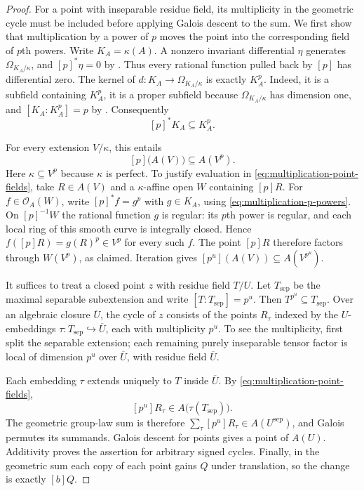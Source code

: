 \begin{proof}
For a point with inseparable residue field, its multiplicity in the
geometric cycle must be included before applying Galois descent to
the sum. We first show that multiplication by a power of $p$ moves
the point into the corresponding field of $p$th powers.
Write $K_A=\kappa(A)$.  A nonzero invariant differential $\eta$
generates $\Omega_{K_A/\kappa}$, and $[p]^*\eta=0$ by
.  Thus every rational function pulled back
by $[p]$ has differential zero.  The kernel of
$d:K_A\longrightarrow\Omega_{K_A/\kappa}$ is exactly $K_A^p$.
Indeed, it is a subfield containing $K_A^p$, it is a proper subfield
because $\Omega_{K_A/\kappa}$ has dimension one, and
$[K_A:K_A^p]=p$ by .  Consequently
\begin{equation}\label{eq:multiplication-p-powers}
                         [p]^*K_A\subseteq K_A^p.
\end{equation}

For every extension $V/\kappa$, this entails
\begin{equation}\label{eq:multiplication-point-fields}
                         [p]\bigl(A(V)\bigr)\subseteq A(V^p).
\end{equation}
Here $\kappa\subseteq V^p$ because $\kappa$ is perfect.  To justify
evaluation in \eqref{eq:multiplication-point-fields}, take
$R\in A(V)$ and a $\kappa$-affine open $W$ containing $[p]R$.
For $f\in\mathcal O_A(W)$, write $[p]^*f=g^p$ with
$g\in K_A$, using \eqref{eq:multiplication-p-powers}.  On
$[p]^{-1}W$ the rational function $g$ is regular: its $p$th power is
regular, and each local ring of this smooth curve is integrally
closed.  Hence $f([p]R)=g(R)^p\in V^p$ for every such $f$.
The point $[p]R$ therefore factors through $W(V^p)$, as claimed.
Iteration gives
$[p^u](A(V))\subseteq A(V^{p^u})$.

It suffices to treat a closed point $z$ with residue field $T/U$.
Let $T_{\mathrm{sep}}$ be the maximal separable subextension and write
$[T:T_{\mathrm{sep}}]=p^u$.  Then
$T^{p^u}\subseteq T_{\mathrm{sep}}$.  Over an algebraic closure
$\overline U$, the cycle of $z$ consists of the points $R_\tau$
indexed by the $U$-embeddings
$\tau:T_{\mathrm{sep}}\hookrightarrow\overline U$, each with
multiplicity $p^u$.  To see the multiplicity, first split the separable
extension; each remaining purely inseparable tensor factor is local
of dimension $p^u$ over $\overline U$, with residue field
$\overline U$.

Each embedding $\tau$ extends uniquely to $T$ inside $\overline U$.
By \eqref{eq:multiplication-point-fields},
\[
             [p^u]R_\tau\in A\bigl(\tau(T_{\mathrm{sep}})\bigr).
\]
The geometric group-law sum is therefore
$\sum_\tau[p^u]R_\tau\in A(U^{\mathrm{sep}})$, and Galois
permutes its summands.  Galois descent for points gives a point of
$A(U)$.  Additivity proves the assertion for arbitrary signed cycles.
Finally, in the geometric sum each copy of each point gains $Q$ under
translation, so the change is exactly $[b]Q$.
\end{proof}

